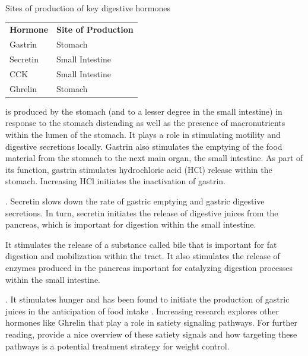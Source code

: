 \documentclass{tufte-handout}
\begin{document}
\begin{margintable}
\caption{Sites of production of key digestive hormones}
\label{tab:gi-hormones}
\begin{tabular}{ll}
\textbf{Hormone} & \textbf{Site of Production} \\
Gastrin          & Stomach                     \\
Secretin         & Small Intestine             \\
CCK              & Small Intestine             \\
Ghrelin          & Stomach                    
\end{tabular}
\end{margintable}

 is produced by the stomach (and to a lesser degree in the small intestine) in response to the stomach distending as well as the presence of macronutrients within the lumen of the stomach. It plays a role in stimulating motility and digestive secretions locally. Gastrin also stimulates the emptying of the food material from the stomach to the next main organ, the small intestine. As part of its function, gastrin stimulates hydrochloric acid (HCl) release within the stomach. Increasing HCl initiates the inactivation of gastrin. 

. Secretin slows down the rate of gastric emptying and gastric digestive secretions. In turn, secretin initiates the release of digestive juices from the pancreas, which is important for digestion within the small intestine. 

 It stimulates the release of a substance called bile that is important for fat digestion and mobilization within the tract. It also stimulates the release of enzymes produced in the pancreas important for catalyzing digestion processes within the small intestine.

. It stimulates hunger and has been found to initiate the production of gastric juices in the anticipation of food intake \citep{Inui2004}. Increasing research explores other hormones like Ghrelin that play a role in satiety signaling pathways. For further reading, \citet{Schwartz2000} provide a nice overview of these satiety signals and how targeting these pathways is a potential treatment strategy for weight control.
\end{document}
